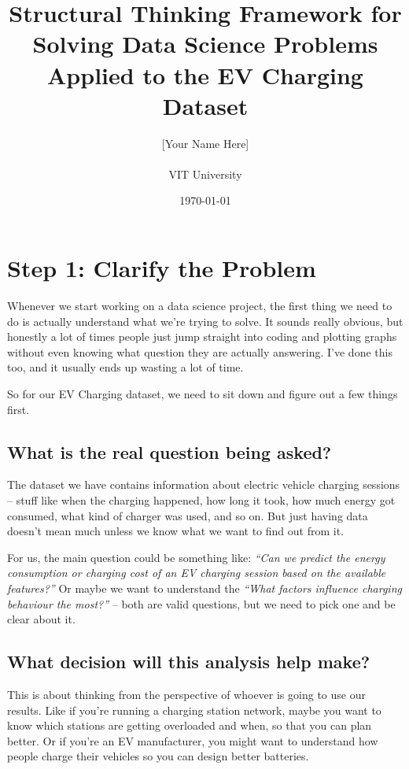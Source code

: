 \documentclass[12pt, a4paper]{article}
\title{\textbf{Structural Thinking Framework for Solving Data Science Problems} \\ \large Applied to the EV Charging Dataset}
\author{[Your Name Here] \\ [Your Registration Number] \\ VIT University}
\date{\today}
\begin{document}
\maketitle

\tableofcontents
\newpage

\section{Step 1: Clarify the Problem}

Whenever we start working on a data science project, the first thing we need to do is actually understand what we're trying to solve. It sounds really obvious, but honestly a lot of times people just jump straight into coding and plotting graphs without even knowing what question they are actually answering. I've done this too, and it usually ends up wasting a lot of time.

So for our EV Charging dataset, we need to sit down and figure out a few things first.

\subsection{What is the real question being asked?}

The dataset we have contains information about electric vehicle charging sessions -- stuff like when the charging happened, how long it took, how much energy got consumed, what kind of charger was used, and so on. But just having data doesn't mean much unless we know what we want to find out from it.

For us, the main question could be something like: \textit{``Can we predict the energy consumption or charging cost of an EV charging session based on the available features?''} Or maybe we want to understand the \textit{``What factors influence charging behaviour the most?''} -- both are valid questions, but we need to pick one and be clear about it.

\subsection{What decision will this analysis help make?}

This is about thinking from the perspective of whoever is going to use our results. Like if you're running a charging station network, maybe you want to know which stations are getting overloaded and when, so that you can plan better. Or if you're an EV manufacturer, you might want to understand how people charge their vehicles so you can design better batteries.
\end{document}
